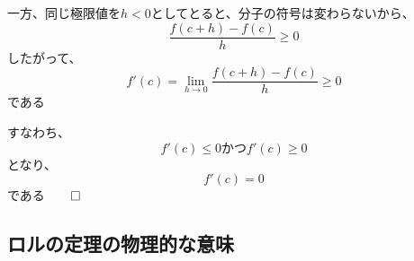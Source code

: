 \documentclass[../book_infinite_continuous_math]{subfiles}
\begin{document}
\br

一方、同じ極限値を$h<0$としてとると、分子の符号は変わらないから、
\begin{equation*}
  \dfrac{f(c+h) - f(c)}{h} \geq 0
\end{equation*}
したがって、
\begin{equation*}
  f'(c) = \lim_{h \to 0} \dfrac{f(c+h) - f(c)}{h} \geq 0
\end{equation*}
である

\br

すなわち、
\begin{equation*}
  f'(c) \leq 0 \text{かつ} f'(c) \geq 0
\end{equation*}
となり、
\begin{equation*}
  f'(c) = 0
\end{equation*}
である$\qed$

\sectionline
\subsection{ロルの定理の物理的な意味}
\end{document}

